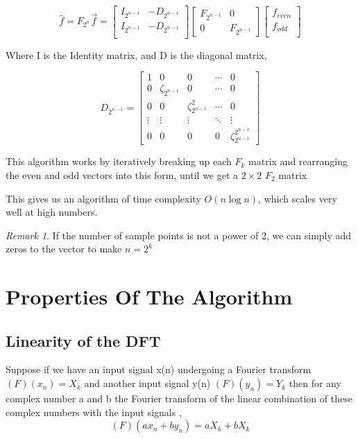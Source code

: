 \documentclass[11pt]{amsart}
\theoremstyle{definition}
\theoremstyle{remark}
\newtheorem{rem}[thm]{Remark}
\numberwithin{equation}{section}
\begin{document}
\[
	\hat{f} = F_{2^n} \vec{f} = \begin{bmatrix}
		I_{2^{n-1}} & -D_{2^{n-1}} \\
		I_{2^{n-1}} & -D_{2^{n-1}} \\
	\end{bmatrix}
	\begin{bmatrix}
		F_{2^{n-1}} & 0 \\
	0 & F_{2^{n-1}}
	\end{bmatrix}
	\begin{bmatrix}
		f_{even} \\
		f_{odd} \\
	\end{bmatrix}
\]

Where I is the Identity matrix, and D is the diagonal matrix,

\[
	D_{2^{n-1}} = \begin{bmatrix}
		1 & 0 & 0 & \cdots & 0 \\
		0 & \zeta_{2^{n-1}} & 0 &\cdots & 0\\
		0 & 0 & \zeta_{2^{n-1}}^2 & \cdots & 0 \\
		\vdots & \vdots & \vdots  &  \ddots & \vdots \\
		0 & 0 & 0 & 0 & \zeta_{2^{n-1}}^{2^{n-1}}
	\end{bmatrix}
\]

This algorithm works by iteratively breaking up each $F_k$ matrix and rearranging the even and odd vectors into this form, until we get a $2\times 2$ $F_2$ matrix

This gives us an algorithm of time complexity $O(n \log{n})$, which scales very well at high numbers.
\begin{rem}
	If the number of sample points is not a power of 2, we can simply add zeros to the vector to make $n = 2^{k}$
\end{rem}
\section{Properties Of The Algorithm}
\subsection{Linearity of the DFT}
Suppose if we have an input signal x(n) undergoing a Fourier transform $(F)(x_n) = X_k$ and another input  signal y(n) $(F)(y_n) = Y_k$ then for any complex number a and b the  Fourier transform of the linear combination of these complex numbers with the input signals , 
\[(F)(ax_n + by_n) = aX_k + bX_k\]
\end{document}
